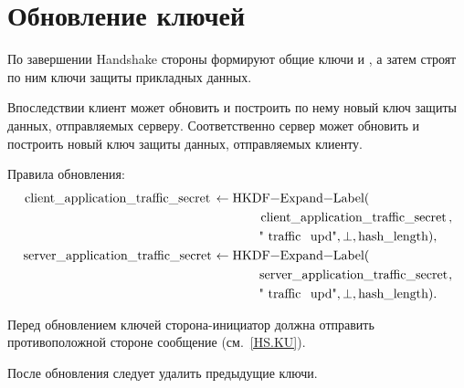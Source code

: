 \section{Обновление ключей}\label{CRYPTO.Upd}

По завершении Handshake стороны формируют общие ключи
 и
, а затем строят по ним ключи защиты
прикладных данных.

Впоследствии клиент может обновить 
и построить по нему новый ключ защиты данных, отправляемых серверу.
%
Соответственно сервер может обновить 
и построить новый ключ защиты данных, отправляемых клиенту.

Правила обновления:
\begin{align*}
\code{client_application_traffic_secret}&\gets\code{HKDF-Expand-Label}(\\
  &\hspace{36pt}\code{client_application_traffic_secret},\\
  &\hspace{36pt}\str{traffic upd}, \perp, \code{hash_length}),\\
\code{server_application_traffic_secret}&\gets\code{HKDF-Expand-Label}(\\
  &\hspace{36pt}\code{server_application_traffic_secret},\\
  &\hspace{36pt}\str{traffic upd}, \perp, \code{hash_length}).
\end{align*}

Перед обновлением ключей сторона-инициатор должна отправить противоположной 
стороне сообщение  (см.~\ref{HS.KU}).

После обновления следует удалить предыдущие ключи.
